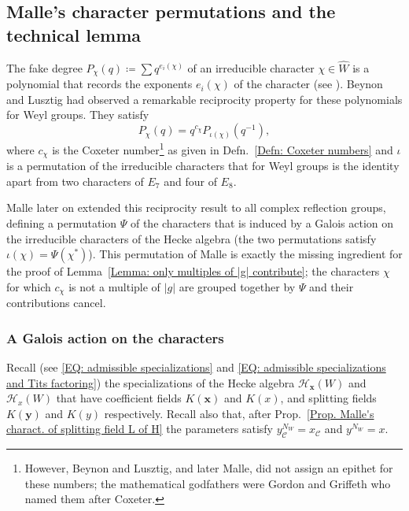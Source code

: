 \documentclass[ALCO, Unicode]{cedram}
\begin{document}
\subsection{Malle's character permutations and the technical lemma}
\label{Section: Malle's character permutations and the technical lemma}

The fake degree $P_{\chi}(q)\coloneqq \sum q^{e_i(\chi)}$ of an irreducible character $\chi\in\widehat{W}$ is a polynomial that records the exponents $e_i(\chi)$ of the character (see \cite[\S4.4]{lehrer-taylor-book}). Beynon and Lusztig \cite[Prop.~A]{beynon-lustzig-coxeter-numbers-genesis} had observed a remarkable reciprocity property for these polynomials for Weyl groups. They satisfy $$P_{\chi}(q)=q^{c_{\chi}}P_{\iota(\chi)}(q^{-1}),$$where $c_{\chi}$ is the Coxeter number\footnote{However, Beynon and Lusztig, and later Malle, did not assign an epithet for these numbers; the mathematical godfathers were Gordon and Griffeth \cite{gordon-griffeth-catalan-numbers} who named them after Coxeter.} as given in Defn.~\ref{Defn: Coxeter numbers} and $\iota$ is a permutation of the irreducible characters that for Weyl groups is the identity apart from two characters of $E_7$ and four of $E_8$. 

Malle later on \cite[Thm.~6.5]{malle-fake-degrees} extended this reciprocity result to all complex reflection groups, defining a permutation $\Psi$ of the characters that is induced by a Galois action on the irreducible characters of the Hecke algebra (the two permutations satisfy $\iota(\chi)=\Psi(\chi^*)$). This permutation of Malle  is exactly the missing ingredient for the proof of Lemma~\ref{Lemma: only multiples of |g| contribute}; the characters $\chi$ for which $c_{\chi}$ is not a multiple of $|g|$ are grouped together by $\Psi$ and their contributions cancel.

\subsubsection*{A Galois action on the characters}

Recall (see \eqref{EQ: admissible specializations} and \eqref{EQ: admissible specializations and Tits factoring}) the specializations of the Hecke algebra $\mathcal{H}_{\bm x}(W)$ and $\mathcal{H}_x(W)$ that have coefficient fields $K(\bm x)$ and $K(x)$, and splitting fields $K(\bm y)$ and $K(y)$ respectively. Recall also that, after Prop.~\ref{Prop. Malle's charact. of splitting field L of H} the parameters satisfy $y_{\mathcal{C}}^{N_W}=x_{\mathcal{C}}$ and $y^{N_W}=x$.
\end{document}
